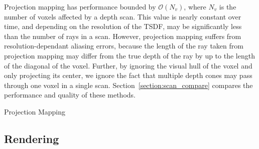 \documentclass[conference]{IEEEtran}
\newcommand{\sref}[1]{Section~\ref{#1}}
\begin{document}
Projection mapping has performance bounded by $\mathcal{O}(N_v)$, where $N_v$ is
the number of voxels affected by a depth scan. This value is nearly constant
over time, and depending on the resolution of the TSDF, may be significantly
less than the number of rays in a scan. However, projection mapping suffers from
resolution-dependant aliasing errors, because the length of the ray taken from projection mapping may differ from the
true depth of the ray by up to the length of the diagonal of the voxel. 
Further, by ignoring the visual hull of the voxel and only projecting its
center, we ignore the fact that multiple depth cones may pass through one voxel
in a single scan.  \sref{section:scan_compare} compares the performance and
quality of these methods.

\begin{algorithm} 
	\caption{Projection Mapping}
	\label{alg:projection_mapping}
	\begin{algorithmic}[1]
		 
		  
	     
		    	\label{alg:line:voxel_carve}
			\EndIf
	    \EndIf
		  
			\label{alg:line:tsdf_update}
		\EndIf
	\EndFor
	\end{algorithmic}
\end{algorithm}
\subsection{Rendering}
\label{section:render}
\end{document}
